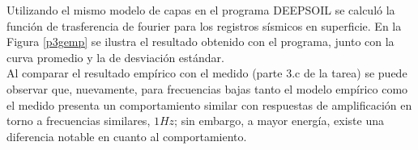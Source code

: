 Utilizando el mismo modelo de capas en el programa DEEPSOIL se calculó la función de trasferencia de fourier para los registros sísmicos en superficie. En la Figura \ref{p3gemp} se ilustra el resultado obtenido con el programa, junto con la curva promedio y la de desviación estándar. \\

Al comparar el resultado empírico con el medido (parte 3.c de la tarea) se puede observar que, nuevamente, para frecuencias bajas tanto el modelo empírico como el medido presenta un comportamiento similar con respuestas de amplificación en torno a frecuencias similares, $1Hz$; sin embargo, a mayor energía, existe una diferencia notable en cuanto al comportamiento.



